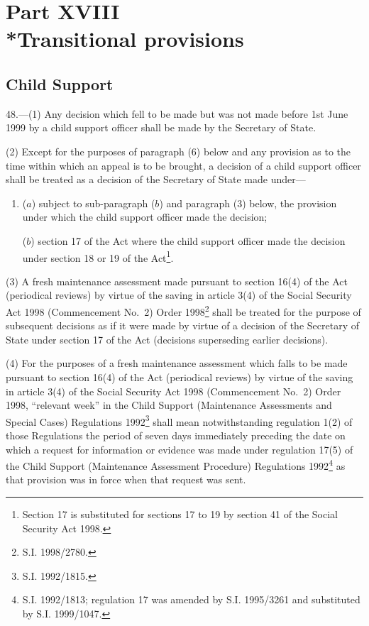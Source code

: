 \documentclass[12pt,a4paper]{article}
\begin{document}
\section[Part XVIII --- Transitional provisions]{Part XVIII\\*Transitional provisions}

\renewcommand\parthead{--- Part XVIII}

\subsection[48. Child Support]{Child Support}

48.—(1) Any decision which fell to be made but was not made before 1st June 1999 by a child support officer shall be made by the Secretary of State.

(2) Except for the purposes of paragraph (6) below and any provision as to the time within which an appeal is to be brought, a decision of a child support officer shall be treated as a decision of the Secretary of State made under—
\begin{enumerate}\item[]
($a$) subject to sub-paragraph ($b$) and paragraph (3) below, the provision under which the child support officer made the decision;

($b$) section 17 of the Act where the child support officer made the decision under section 18 or 19 of the Act\footnote{\frenchspacing Section 17 is substituted for sections 17 to 19 by section 41 of the Social Security Act 1998.}.
\end{enumerate}

(3) A fresh maintenance assessment made pursuant to section 16(4) of the Act (periodical reviews) by virtue of the saving in article 3(4) of the Social Security Act 1998 (Commencement No.\ 2) Order 1998\footnote{\frenchspacing S.I. 1998/2780.} shall be treated for the purpose of subsequent decisions as if it were made by virtue of a decision of the Secretary of State under section 17 of the Act (decisions superseding earlier decisions).

(4) For the purposes of a fresh maintenance assessment which falls to be made pursuant to section 16(4) of the Act (periodical reviews) by virtue of the saving in article 3(4) of the Social Security Act 1998 (Commencement No.\ 2) Order 1998, “relevant week” in the Child Support (Maintenance Assessments and Special Cases) Regulations 1992\footnote{\frenchspacing S.I. 1992/1815.} shall mean notwithstanding regulation 1(2) of those Regulations the period of seven days immediately preceding the date on which a request for information or evidence was made under regulation 17(5) of the Child Support (Maintenance Assessment Procedure) Regulations 1992\footnote{\frenchspacing S.I. 1992/1813; regulation 17 was amended by S.I. 1995/3261 and substituted by S.I. 1999/1047.} as that provision was in force when that request was sent.
\end{document}
